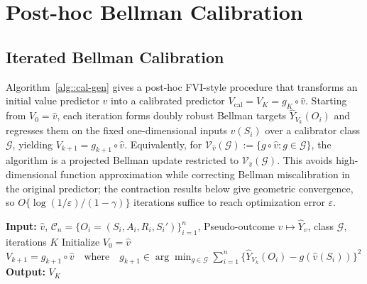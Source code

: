 \documentclass{article}
\newcommand{\BCINPUT}{\STATE \textbf{Input: }}
\newcommand{\BCOUTPUT}{\STATE \textbf{Output: }}
\theoremstyle{plain}
\theoremstyle{definition}
\theoremstyle{remark}
\begin{document}
\section{Post-hoc Bellman Calibration}
\label{sec:posthoc-calibration}

\subsection{Iterated Bellman Calibration}
\label{sec:iterated-bellman-calibration}

Algorithm~\ref{alg::cal-gen} gives a post-hoc FVI-style procedure that
transforms an initial value predictor \(\hat v\) into a calibrated predictor
\(V_{\mathrm{cal}}=V_K=g_K\circ \hat v\). Starting from \(V_0=\hat v\), each
iteration forms doubly robust Bellman targets \(\widehat Y_{V_k}(O_i)\) and
regresses them on the fixed one-dimensional inputs \(\hat v(S_i)\) over a
calibrator class \(\mathcal G\), yielding
\(V_{k+1}=g_{k+1}\circ \hat v\). Equivalently, for
\(\mathcal V_{\hat v}(\mathcal G):=\{g\circ\hat v:g\in\mathcal G\}\), the
algorithm is a projected Bellman update restricted to
\(\mathcal V_{\hat v}(\mathcal G)\). This avoids high-dimensional function
approximation while correcting Bellman miscalibration in the original predictor;
the contraction results below give geometric convergence, so
\(O\{\log(1/\varepsilon)/(1-\gamma)\}\) iterations suffice to reach optimization
error \(\varepsilon\).

\begin{algorithm}[h]
\caption{\textbf{Iterated Bellman Calibration}}
\label{alg::cal-gen}
\begin{algorithmic}[1]
\BCINPUT \(\hat v\), \(\mathcal C_n=\{O_i=(S_i,A_i,R_i,S_i')\}_{i=1}^n\), Pseudo-outcome \(v\mapsto\widehat Y_v\), class \(\mathcal G\), iterations \(K\)
\STATE Initialize \(V_0=\hat v\)
  \STATE \(V_{k+1}=g_{k+1}\circ\hat v \quad \text{where} \quad g_{k+1}\in\arg\min_{g\in\mathcal G}\sum_{i=1}^n
  \{\widehat Y_{V_k}(O_i)-g(\hat v(S_i))\}^2\)
\ENDFOR
\BCOUTPUT \(V_K\)
\end{algorithmic}
\end{algorithm}
\end{document}
